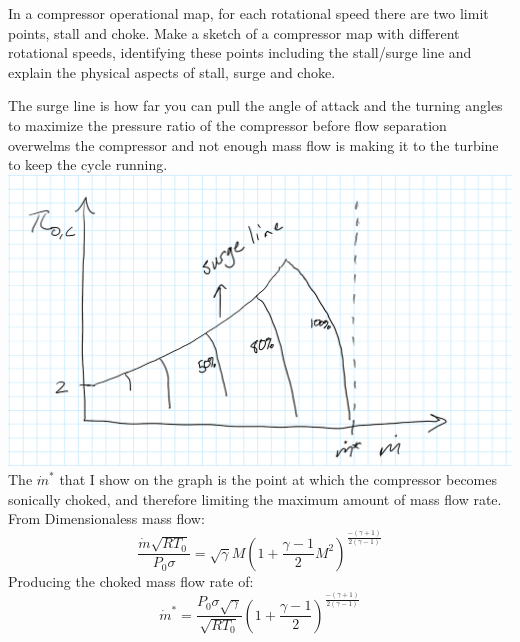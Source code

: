 \documentclass[12pt]{exam}
\begin{document}
\begin{questions}
\newpage 
\begin{question}
In a compressor operational map, for each rotational speed there are two limit points, stall
and choke. Make a sketch of a compressor map with different rotational speeds, identifying
these points including the stall/surge line and explain the physical aspects of stall, surge and
choke.
\end{question}
\begin{solutionorbox}[\stretch{1}]
The surge line is how far you can pull the angle of attack and the turning angles to maximize the pressure ratio of the compressor
before flow separation overwelms the compressor and not enough mass flow is making it to the turbine to keep the cycle running.
\\
\includegraphics[width=\linewidth]{hand drawn compressor map.png}
The \(\dot{m}^*\) that I show on the graph is the point at which the compressor becomes sonically choked, and therefore limiting the 
maximum amount of mass flow rate.
\\ 
From Dimensionaless mass flow:
\[
\frac{\dot{m}\sqrt{R T_0}}{P_0 \sigma} = \sqrt{\gamma} M \left(1 + \frac{\gamma-1 }{2} M^2\right)^{\frac{-(\gamma+1)}{2(\gamma-1)}}
\]
Producing the choked mass flow rate of:
\[
\dot{m}^* = \frac{P_0 \sigma \sqrt{\gamma}}{\sqrt{R T_0}} \left(1 + \frac{\gamma-1 }{2}\right)^{\frac{-(\gamma+1)}{2(\gamma-1)}}
\]
\end{solutionorbox}


\end{questions}
\end{document}
